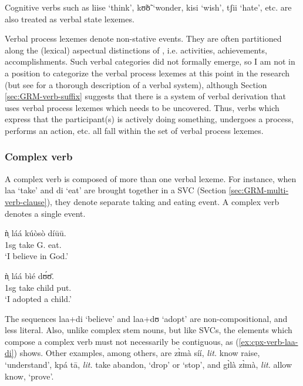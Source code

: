 \begin{exe}
\begin{exe}
\begin{exe}
\begin{exe}
\begin{exe}
\begin{exe}
\begin{exe}
\begin{exe}
\begin{exe}
\begin{exe}
\begin{exe}
Cognitive verbs such as {\sls liise} `think',  {\sls kʊ̃ʊ̃} `wonder, 
{\sls kisi} `wish', {\sls tʃii} `hate', etc.  are also treated as verbal 
state
lexemes. 

Verbal process lexemes denote non-stative events. They are often partitioned
along the
(lexical) aspectual distinctions of  \citet{Vend57}, i.e. activities, 
achievements, accomplishments. Such verbal categories did not formally emerge, 
so I am not in a position to categorize the verbal process lexemes at this 
point 
in the research (but see \citealt[51]{Bonv88} for a thorough description of a 
 verbal system), although Section \ref{sec:GRM-verb-suffix} suggests that 
there is a system of verbal derivation  that  uses verbal process lexemes which 
needs to be uncovered.  Thus, verbs which express that the participant(s) is 
actively doing something, undergoes a process, performs an action, etc. all 
fall 
within the  set of verbal process lexemes. 



\subsubsection{Complex verb}
\label{sec:GRM-complex-verb}

A complex verb is  composed of more than one verbal lexeme. For
instance, when {\sls laa} `take' and {\sls di}
`eat' are brought together in a SVC (Section \ref{sec:GRM-multi-verb-clause}),
they denote separate taking and eating event. A complex verb denotes a single 
event.

\ea\label{ex:cpx-verb-laa-di}
\ea
 \gll ǹ̩ láá kúòsò díūū.\\
{\sc 1sg} take G.  eat.{\foc}\\
\glt `I believe in God.'

\ex
 \gll  ǹ̩ láá bìé dʊ́ʊ̄.\\
{\sc 1sg} take child put.{\foc}\\
\glt `I adopted a child.'
\z 
 \z
 
 The sequences  {\sls laa}+{\sls di} `believe'  and {\sls laa}+{\sls dʊ} 
`adopt'  
are  non-compositional, and less literal. Also, unlike complex stem nouns, but 
like SVCs, the elements which compose a complex verb must not necessarily be 
contiguous,  as  (\ref{ex:cpx-verb-laa-di}) shows. Other examples, among 
others, 
 are {\sls zɪ̀mà síí}, {\it lit.} know raise, `understand',  {\sls kpá 
tā}, 
{\it lit.}  take abandon, `drop' or `stop', and {\sls gɪ̀là zɪ̀mà}, {\it 
lit.} 
allow know, `prove'.




\end{exe}
\end{exe}
\end{exe}
\end{exe}
\end{exe}
\end{exe}
\end{exe}
\end{exe}
\end{exe}
\end{exe}
\end{exe}
